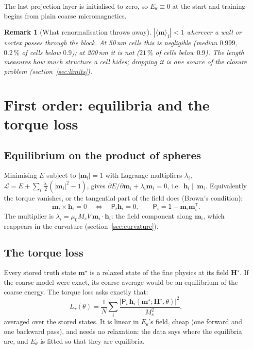 \documentclass[11pt,a4paper]{article}
\newcommand{\m}{\bm{m}}
\newcommand{\h}{\bm{h}}
\newcommand{\Hext}{\bm{H}}
\newcommand{\T}{\mathsf{T}}
\newcommand{\proj}{\mathsf{P}}
\newtheorem*{remark}{Remark}
\begin{document}
The last projection layer is initialised to zero, so $E_\theta\equiv0$ at the start and training begins
from plain coarse micromagnetics.

\begin{remark}[What renormalisation throws away]
$|\langle\m\rangle_I|<1$ wherever a wall or vortex passes through the block. At 50\,nm cells this is
negligible (median $0.999$, $0.2\,\%$ of cells below $0.9$); at 200\,nm it is not ($21\,\%$ of cells below
$0.9$). The length measures how much structure a cell hides; dropping it is one source of the closure
problem (section~\ref{sec:limits}).
\end{remark}

\section{First order: equilibria and the torque loss}

\subsection{Equilibrium on the product of spheres}

Minimising $E$ subject to $|\m_i|=1$ with Lagrange multipliers $\lambda_i$,
$\mathcal{L} = E + \sum_i \tfrac{\lambda_i}{2}(|\m_i|^2-1)$, gives
$\partial E/\partial\m_i + \lambda_i\m_i = 0$, i.e.\ $\h_i \parallel \m_i$. Equivalently the torque
vanishes, or the tangential part of the field does (Brown's condition):
\begin{equation}
  \m_i\times\h_i = 0
  \quad\Longleftrightarrow\quad
  \proj_i \h_i = 0, \qquad \proj_i = \mathsf{1}-\m_i\m_i^\T .
  \label{eq:brown}
\end{equation}
The multiplier is $\lambda_i = \mu_0 M_s V\,\m_i\cdot\h_i$: the field component along $\m_i$, which
reappears in the curvature (section~\ref{sec:curvature}).

\subsection{The torque loss}

Every stored truth state $\m^\star$ is a relaxed state of the fine physics at its field $\Hext^\star$.
If the coarse model were exact, its coarse average would be an equilibrium of the coarse energy. The
torque loss asks exactly that:
\begin{equation}
  L_\tau(\theta) = \frac{1}{N}\sum_i \frac{\bigl|\proj_i\,\h_i(\m^\star;\Hext^\star,\theta)\bigr|^2}{M_s^2},
  \label{eq:torque}
\end{equation}
averaged over the stored states. It is linear in $E_\theta$'s field, cheap (one forward and one
backward pass), and needs no relaxation: the data says where the equilibria are, and $E_\theta$ is
fitted so that they are equilibria.
\end{document}
